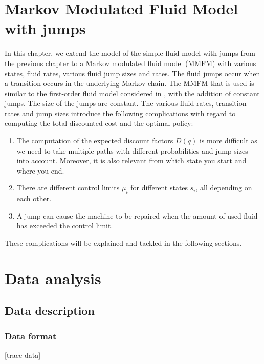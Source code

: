 \chapter{Markov Modulated Fluid Model with jumps}
In this chapter, we extend the model of the simple fluid model with jumps from the previous chapter to a Markov modulated fluid model (MMFM) with various states, fluid rates, various fluid jump sizes and rates.
The fluid jumps occur when a transition occurs in the underlying Markov chain.
The MMFM that is used is similar to the first-order fluid model considered in \cite{Gribaudo2007}, with the addition of constant jumps.
The size of the jumps are constant.
The various fluid rates, transition rates and jump sizes introduce the following complications with regard to computing the total discounted cost and the optimal policy:
\begin{enumerate}
	\item The computation of the expected discount factors $D(q)$ is more difficult as we need to take multiple
	paths with different probabilities and jump sizes into account.
	Moreover, it is also relevant from which state you start and where you end.
	\item There are different control limits $\mu_i$ for different states $s_i$, all depending on each other.
	\item A jump can cause the machine to be repaired when the amount of used fluid has exceeded the control limit.
\end{enumerate}
These complications will be explained and tackled in the following sections.









\chapter{Data analysis}
\section{Data description}
\subsection{Data format}
[trace data]
